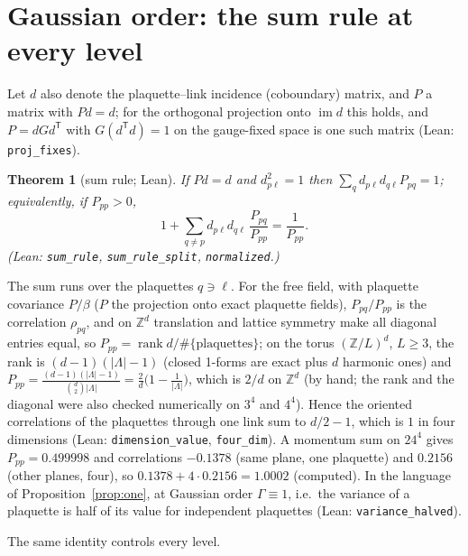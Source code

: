 \documentclass[11pt,a4paper]{article}
\newtheorem{theorem}{Theorem}[section]
\theoremstyle{definition}
\theoremstyle{remark}
\newcommand{\code}[1]{\texttt{#1}}
\begin{document}
\section{Gaussian order: the sum rule at every level}\label{sec:gauss}

Let $d$ also denote the plaquette--link incidence (coboundary) matrix, and $P$ a matrix with $Pd=d$; for the orthogonal projection onto $\operatorname{im}d$ this holds, and $P=dGd^{\mathsf T}$ with $G(d^{\mathsf T}d)=1$ on the gauge-fixed space is one such matrix (Lean: \code{proj\_fixes}).

\begin{theorem}[sum rule; Lean]\label{thm:sumrule}
If $Pd=d$ and $d_{p\ell}^2=1$ then $\sum_qd_{p\ell}d_{q\ell}P_{pq}=1$; equivalently, if $P_{pp}>0$,
\[
1+\sum_{q\ne p}d_{p\ell}d_{q\ell}\,\frac{P_{pq}}{P_{pp}}=\frac1{P_{pp}}.
\]
(Lean: \code{sum\_rule}, \code{sum\_rule\_split}, \code{normalized}.)
\end{theorem}

The sum runs over the plaquettes $q\ni\ell$. For the free field, with plaquette covariance $P/\beta$ ($P$ the projection onto exact plaquette fields), $P_{pq}/P_{pp}$ is the correlation $\rho_{pq}$, and on $\mathbb Z^d$ translation and lattice symmetry make all diagonal entries equal, so $P_{pp}=\operatorname{rank}d/\#\{\text{plaquettes}\}$; on the torus $(\mathbb Z/L)^d$, $L\ge3$, the rank is $(d-1)(|\Lambda|-1)$ (closed 1-forms are exact plus $d$ harmonic ones) and $P_{pp}=\frac{(d-1)(|\Lambda|-1)}{\binom d2|\Lambda|}=\frac2d\bigl(1-\frac1{|\Lambda|}\bigr)$, which is $2/d$ on $\mathbb Z^d$ (by hand; the rank and the diagonal were also checked numerically on $3^4$ and $4^4$). Hence the oriented correlations of the plaquettes through one link sum to $d/2-1$, which is $1$ in four dimensions (Lean: \code{dimension\_value}, \code{four\_dim}). A momentum sum on $24^4$ gives $P_{pp}=0.499998$ and correlations $-0.1378$ (same plane, one plaquette) and $0.2156$ (other planes, four), so $0.1378+4\cdot0.2156=1.0002$ (computed). In the language of Proposition~\ref{prop:one}, at Gaussian order $\Gamma\equiv1$, i.e.\ the variance of a plaquette is half of its value for independent plaquettes (Lean: \code{variance\_halved}).

The same identity controls every level.
\end{document}
